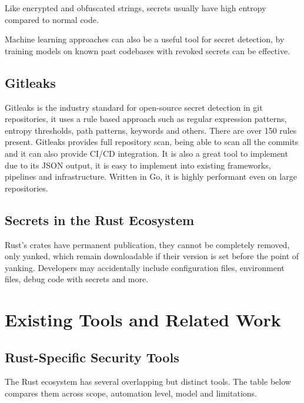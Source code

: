 Like encrypted and obfuscated strings, secrets usually have high entropy compared to normal code.

Machine learning approaches can also be a useful tool for secret detection, by training models on known past codebases with revoked secrets can be effective.

\subsection{Gitleaks}\label{sect:gitleaks}

Gitleaks is the industry standard for open-source secret detection in git repositories, it uses a rule based approach such as regular expression patterns, entropy thresholds, path patterns, keywords and others. There are over 150 rules present. Gitleaks provides full repository scan, being able to scan all the commits and it can also provide CI/CD integration. It is also a great tool to implement due to its JSON output, it is easy to implement into existing frameworks, pipelines and infrastructure. Written in Go, it is highly performant even on large repositories.

\subsection{Secrets in the Rust Ecosystem}\label{sect:secrets-rust}

Rust's crates have permanent publication, they cannot be completely removed, only yanked, which remain downloadable if their version is set before the point of yanking.
Developers may accidentally include configuration files, environment files, debug code with secrets and more.

\section{Existing Tools and Related Work}\label{sect:existing-tools}

\subsection{Rust-Specific Security Tools}\label{sect:rust-specific-security-tools}

The Rust ecosystem has several overlapping but distinct tools. The table below compares them across scope, automation level, model and limitations.

